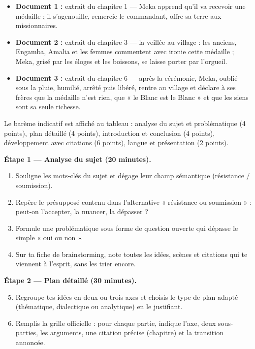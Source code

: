 \documentclass[11pt]{article}
\newcounter{popsec}
\newcounter{popsub}
\newcommand{\courssub}[1]{%
  \stepcounter{popsub}%
  \par\vspace{9pt}\noindent{\popxbold\fontsize{11.5}{13}\selectfont\color{popink}{\color{poporange}\thepopsec.\thepopsub}\hspace{6pt}#1}\par\nopagebreak\vspace{4pt}
}
\begin{document}
\begin{itemize}
\item \textbf{Document 1 :} extrait du chapitre 1 — Meka apprend qu'il va recevoir une médaille ; il s'agenouille, remercie le commandant, offre sa terre aux missionnaires.
\item \textbf{Document 2 :} extrait du chapitre 3 — la veillée au village : les anciens, Engamba, Amalia et les femmes commentent avec ironie cette médaille ; Meka, grisé par les éloges et les boissons, se laisse porter par l'orgueil.
\item \textbf{Document 3 :} extrait du chapitre 6 — après la cérémonie, Meka, oublié sous la pluie, humilié, arrêté puis libéré, rentre au village et déclare à ses frères que la médaille n'est rien, que « le Blanc est le Blanc » et que les siens sont sa seule richesse.
\end{itemize}

Le barème indicatif est affiché au tableau : analyse du sujet et problématique (4 points), plan détaillé (4 points), introduction et conclusion (4 points), développement avec citations (6 points), langue et présentation (2 points).

\courssub{Consignes}

\textbf{Étape 1 — Analyse du sujet (20 minutes).}
\begin{enumerate}
\item Souligne les mots-clés du sujet et dégage leur champ sémantique (résistance / soumission).
\item Repère le présupposé contenu dans l'alternative « résistance ou soumission » : peut-on l'accepter, la nuancer, la dépasser ?
\item Formule une problématique sous forme de question ouverte qui dépasse le simple « oui ou non ».
\item Sur ta fiche de brainstorming, note toutes les idées, scènes et citations qui te viennent à l'esprit, sans les trier encore.
\end{enumerate}

\textbf{Étape 2 — Plan détaillé (30 minutes).}
\begin{enumerate}
\setcounter{enumi}{4}
\item Regroupe tes idées en deux ou trois axes et choisis le type de plan adapté (thématique, dialectique ou analytique) en le justifiant.
\item Remplis la grille officielle : pour chaque partie, indique l'axe, deux sous-parties, les arguments, une citation précise (chapitre) et la transition annoncée.
\end{enumerate}
\end{document}
